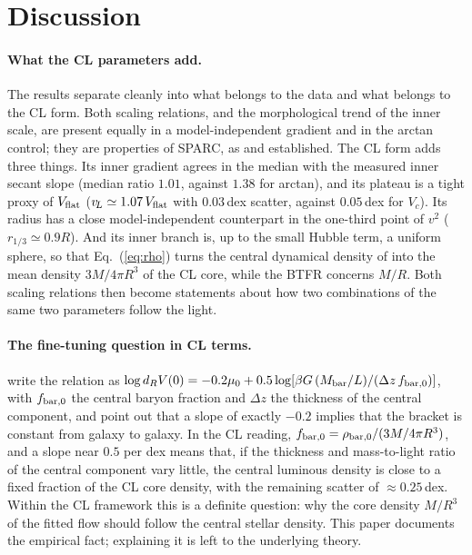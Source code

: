 \documentclass[11pt,a4paper]{article}
\newcommand{\vL}{v_{\!L}}
\newcommand{\Vf}{V_{\rm flat}}
\begin{document}
\section{Discussion}
\label{sec:disc}

\paragraph{What the CL parameters add.} The results separate cleanly into what belongs to the data and what belongs to the CL form. Both scaling relations, and the morphological trend of the inner scale, are present equally in a model-independent gradient and in the arctan control; they are properties of SPARC, as \citet{Lelli2013} and \citet{Lelli2016btfr} established. The CL form adds three things. Its inner gradient agrees in the median with the measured inner secant slope (median ratio $1.01$, against $1.38$ for arctan), and its plateau is a tight proxy of $\Vf$ ($\vL\simeq1.07\,\Vf$ with $0.03$\,dex scatter, against $0.05$\,dex for $V_c$). Its radius has a close model-independent counterpart in the one-third point of $v^2$ ($r_{1/3}\simeq0.9R$). And its inner branch is, up to the small Hubble term, a uniform sphere, so that Eq.~(\ref{eq:rho}) turns the central dynamical density of \citet{Lelli2013} into the mean density $3M/4\pi R^3$ of the CL core, while the BTFR concerns $M/R$. Both scaling relations then become statements about how two combinations of the same two parameters follow the light.

\paragraph{The fine-tuning question in CL terms.} \citet{Lelli2013} write the relation as $\log d_RV(0)=-0.2\mu_0+0.5\log[\beta G\,(M_{\rm bar}/L)/(\Delta z\,f_{\rm bar,0})]$, with $f_{\rm bar,0}$ the central baryon fraction and $\Delta z$ the thickness of the central component, and point out that a slope of exactly $-0.2$ implies that the bracket is constant from galaxy to galaxy. In the CL reading, $f_{\rm bar,0}=\rho_{\rm bar,0}/(3M/4\pi R^3)$, and a slope near $0.5$ per dex means that, if the thickness and mass-to-light ratio of the central component vary little, the central luminous density is close to a fixed fraction of the CL core density, with the remaining scatter of $\approx0.25$\,dex. Within the CL framework this is a definite question: why the core density $M/R^3$ of the fitted flow should follow the central stellar density. This paper documents the empirical fact; explaining it is left to the underlying theory.
\end{document}
